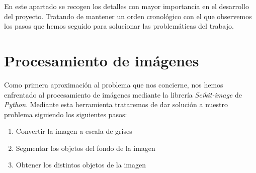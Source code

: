 
En este apartado se recogen los detalles con mayor importancia en el desarrollo del proyecto. Tratando de mantener un orden cronológico con el que observemos los pasos que hemos seguido para solucionar las problemáticas del trabajo.

\begin{comment}
Este apartado pretende recoger los aspectos más interesantes del desarrollo del proyecto, comentados por los autores del mismo.
Debe incluir desde la exposición del ciclo de vida utilizado, hasta los detalles de mayor relevancia de las fases de análisis, diseño e implementación.
Se busca que no sea una mera operación de copiar y pegar diagramas y extractos del código fuente, sino que realmente se justifiquen los caminos de solución que se han tomado, especialmente aquellos que no sean triviales.
Puede ser el lugar más adecuado para documentar los aspectos más interesantes del diseño y de la implementación, con un mayor hincapié en aspectos tales como el tipo de arquitectura elegido, los índices de las tablas de la base de datos, normalización y desnormalización, distribución en ficheros3, reglas de negocio dentro de las bases de datos (EDVHV GH GDWRV DFWLYDV), aspectos de desarrollo relacionados con el WWW...
Este apartado, debe convertirse en el resumen de la experiencia práctica del proyecto, y por sí mismo justifica que la memoria se convierta en un documento útil, fuente de referencia para los autores, los tutores y futuros alumnos.
\end{comment}

\section{Procesamiento de imágenes}
\label{procimg}
Como primera aproximación al problema que nos concierne, nos hemos enfrentado al procesamiento de imágenes mediante la librería \textit{Scikit-image} de \textit{Python}. Mediante esta herramienta trataremos de dar solución a nuestro problema siguiendo los siguientes pasos:

\begin{enumerate}[1.]
  \item Convertir la imagen a escala de grises
  \item Segmentar los objetos del fondo de la imagen
  \item Obtener los distintos objetos de la imagen
\end{enumerate}

